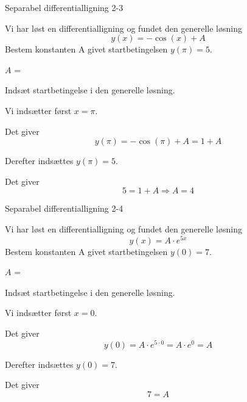 \documentclass{article}
\begin{document}
\begin{exercise}{Separabel differentialligning 2-3}

Vi har løst en differentialligning og fundet den generelle løsning
\[
y(x) = - \cos(x) + A
\]
Bestem konstanten A givet startbetingelsen $y(\pi)=5$.

$A$ = 

\hint

Indsæt startbetingelse i den generelle løsning.


\hint

Vi indsætter først $x=\pi$.

\hint

Det giver
\[
y(\pi)= - \cos (\pi) + A = 1 + A
\]

\hint

Derefter indsættes $y(\pi)=5$.

\hint

Det giver
\[
5 = 1 + A \Rightarrow A = 4
\]

\end{exercise}

\newpage


\begin{exercise}{Separabel differentialligning 2-4}


Vi har løst en differentialligning og fundet den generelle løsning
\[
y(x) = A \cdot e^{5x}
\]
Bestem konstanten A givet startbetingelsen $y(0)=7$.

$A$ = 

\hint

Indsæt startbetingelse i den generelle løsning.


\hint

Vi indsætter først $x=0$.

\hint

Det giver
\[
y(0)= A \cdot e^{5 \cdot 0} = A \cdot e^0 = A
\]

\hint

Derefter indsættes $y(0)=7$.

\hint

Det giver
\[
7 = A
\]

\end{exercise}

\newpage
\end{document}
